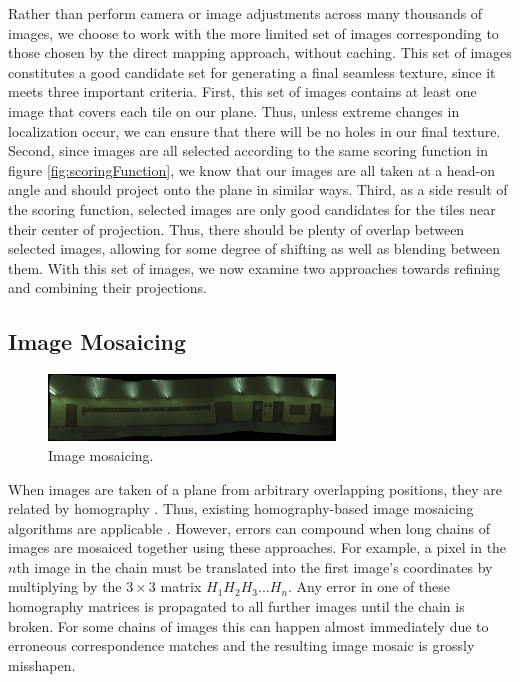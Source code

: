 \documentclass[10pt,twocolumn,letterpaper]{article}
\begin{document}
Rather than perform camera or image adjustments across many thousands
of images, we choose to work with the more limited set of images
corresponding to those chosen by the direct mapping approach, without
caching. This set of images constitutes a good candidate set for
generating a final seamless texture, since it meets three important
criteria. First, this set of images contains at least one image that
covers each tile on our plane. Thus, unless extreme changes in
localization occur, we can ensure that there will be no holes in our
final texture. Second, since images are all selected according to the
same scoring function in figure \ref{fig:scoringFunction}, we know
that our images are all taken at a head-on angle and should project
onto the plane in similar ways. Third, as a side result of the scoring
function, selected images are only good candidates for the tiles near
their center of projection. Thus, there should be plenty of overlap
between selected images, allowing for some degree of shifting as well
as blending between them. With this set of images, we now examine two
approaches towards refining and combining their projections.

\subsection{Image Mosaicing}

\begin{figure}
  \centering
  \includegraphics[width=3in]{panoMy.jpg}
  \caption{Image mosaicing. }
  \label{fig:mosaic}
\end{figure}


When images are taken of a plane from arbitrary overlapping positions,
they are related by homography \cite{hz}. Thus, existing
homography-based image mosaicing algorithms are applicable
\cite{brown2007automatic}. However, errors can compound when long
chains of images are mosaiced together using these approaches. For
example, a pixel in the $n$th image in the chain must be translated
into the first image's coordinates by multiplying by the $3\times3$
matrix $H_1 H_2 H_3 ... H_n$. Any error in one of these homography
matrices is propagated to all further images until the chain is
broken. For some chains of images this can happen almost immediately
due to erroneous correspondence matches and the resulting image mosaic
is grossly misshapen.
\end{document}
